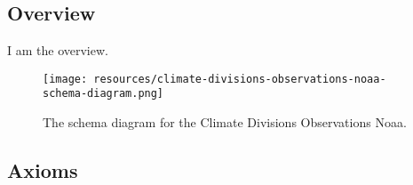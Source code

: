 \subsection{Overview}
\label{ssec:overview}

I am the overview.

\begin{figure}[h!]
  \begin{center}
    \texttt{[image: resources/climate-divisions-observations-noaa-schema-diagram.png]}
  \end{center}
  \caption{The schema diagram for the Climate Divisions Observations Noaa.}
  \label{fig:ov-diagram}
\end{figure}


\subsection{Axioms}
